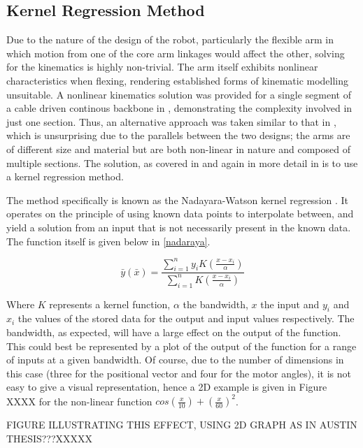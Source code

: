 \documentclass[11pt]{article}
\begin{document}
\subsection{Kernel Regression Method}
Due to the nature of the design of the robot, particularly the flexible arm in which motion from one of the core arm linkages would affect the other, solving for the kinematics is highly non-trivial. The arm itself exhibits nonlinear characteristics when flexing, rendering established forms of kinematic modelling unsuitable. A nonlinear kinematics solution was provided for a single segment of a cable driven continous backbone in \cite{li2002}, demonstrating the complexity involved in just one section. Thus, an alternative approach was taken similar to that in \cite{GreggSmithDesign}, which is unsurprising due to the parallels between the two designs; the arms are of different size and material but are both non-linear in nature and composed of multiple sections. The solution, as covered in \cite{GreggSmithDesign} and again in more detail in \cite{GreggSmithPhd} is to use a kernel regression method.

The method specifically is known as the Nadayara-Watson kernel regression \cite{nadaraya1964}. It operates on the principle of using known data points to interpolate between, and yield a solution from an input that is not necessarily present in the known data. The function itself is given below in \eqref{nadaraya}.

\begin{equation}\label{nadaraya}
\bar{y}(\bar{x}) = \frac{\sum_{i=1}^{n}y_{i}K(\frac{x - x_{i}}{\alpha})}{\sum_{i=1}^{n}K(\frac{x - x_{i}}{\alpha})}
\end{equation}

Where $K$ represents a kernel function, $\alpha$ the bandwidth, $x$ the input and $y_{i}$ and $x_{i}$ the values of the stored data for the output and input values respectively. The bandwidth, as expected, will have a large effect on the output of the function. This could best be represented by a plot of the output of the function for a range of inputs at a given bandwidth. Of course, due to the number of dimensions in this case (three for the positional vector and four for the motor angles), it is not easy to give a visual representation, hence a 2D example is given in Figure XXXX for the non-linear  function $cos(\frac{x}{10}) + (\frac{x}{60})^2$. 

FIGURE ILLUSTRATING THIS EFFECT, USING 2D GRAPH AS IN AUSTIN THESIS???XXXXX
\end{document}
